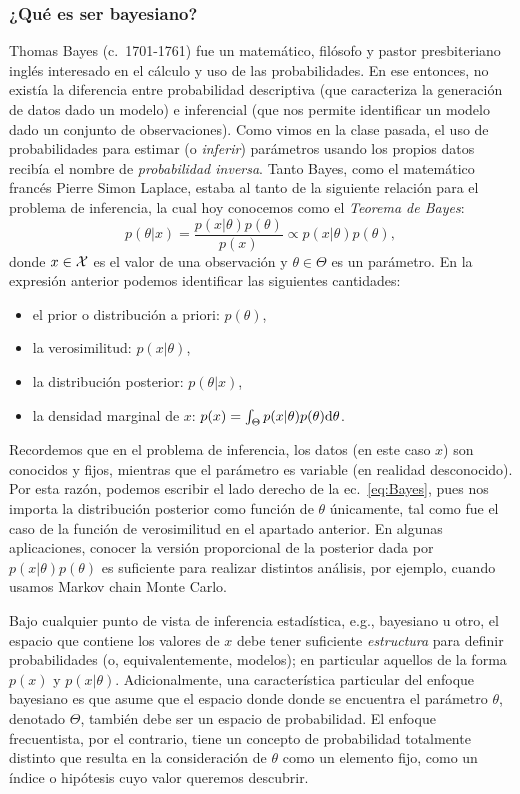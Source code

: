 \subsubsection{¿Qué es ser bayesiano?}
\label{ssub:que_es_bayes}

Thomas Bayes (c.~1701-1761) fue un matemático, filósofo y pastor presbiteriano inglés interesado en el cálculo y uso de las probabilidades. En ese entonces, no existía la diferencia entre probabilidad descriptiva (que caracteriza la generación de datos dado un modelo) e inferencial (que nos permite identificar un modelo dado un conjunto de observaciones). Como vimos en la clase pasada, el uso de probabilidades para estimar (o \emph{inferir}) parámetros usando los propios datos recibía el nombre de \emph{probabilidad inversa}. Tanto Bayes, como el matemático francés Pierre Simon Laplace, estaba al tanto de la siguiente relación para el problema de inferencia, la cual hoy conocemos como el \emph{Teorema de Bayes}:
\begin{equation}
	p(\theta|x) = \frac{p(x|\theta)p(\theta)}{p(x)} \propto p(x|\theta)p(\theta),\label{eq:Bayes}
\end{equation}
donde $x\in{\mathcal X}$ es el valor de una observación y $\theta\in\Theta$ es un parámetro. En la expresión anterior podemos identificar las siguientes cantidades:
\begin{itemize}
	\item el prior o distribución a priori: $p(\theta)$,
	\item la verosimilitud: $p(x|\theta)$,
	\item la distribución posterior: $p(\theta|x)$,
	\item la densidad marginal de $x$: $p(x) = \int_\Theta p(x|\theta)p(\theta){\text d}\theta$.
\end{itemize}
Recordemos que en el problema de inferencia, los datos (en este caso $x$) son conocidos y fijos, mientras que el parámetro es variable (en realidad desconocido). Por esta razón, podemos escribir el lado derecho de la ec.~\eqref{eq:Bayes}, pues nos importa la distribución posterior como función de $\theta$ únicamente, tal como fue el caso de la función de verosimilitud en el apartado anterior. En algunas aplicaciones, conocer la versión proporcional de la posterior dada por $p(x|\theta)p(\theta)$ es suficiente para realizar distintos análisis, por ejemplo, cuando usamos Markov chain Monte Carlo.

Bajo cualquier punto de vista de inferencia estadística, e.g., bayesiano u otro, el espacio que contiene los valores de $x$ debe tener suficiente \emph{estructura} para definir probabilidades (o, equivalentemente, modelos); en particular aquellos de la forma $p(x)$ y $p(x|\theta)$. Adicionalmente, una característica particular del enfoque bayesiano es que asume que el espacio donde donde se encuentra el parámetro $\theta$, denotado $\Theta$, también debe ser un espacio de probabilidad. El enfoque frecuentista, por el contrario, tiene un concepto de probabilidad totalmente distinto que resulta en la consideración de $\theta$ como un elemento fijo, como un índice o hipótesis cuyo valor queremos descubrir.

